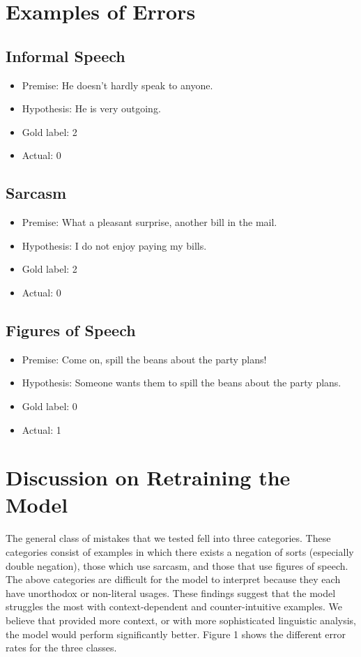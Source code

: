 \documentclass{article}
\begin{document}
\section{Examples of Errors}
\subsection{Informal Speech}
\begin{itemize}
\item Premise: He doesn’t hardly speak to anyone.
\item Hypothesis: He is very outgoing.
\item Gold label: 2
\item Actual: 0
\end{itemize}

\subsection{Sarcasm}
\begin{itemize}
\item Premise: What a pleasant surprise, another bill in the mail.
\item Hypothesis: I do not enjoy paying my bills.
\item Gold label: 2
\item Actual: 0
\end{itemize}
  
\subsection{Figures of Speech}
\begin{itemize}
\item Premise: Come on, spill the beans about the party plans!
\item Hypothesis: Someone wants them to spill the beans about the party plans.
\item Gold label: 0
\item Actual: 1
\end{itemize}

\newpage
\section{Discussion on Retraining the Model}
The general class of mistakes that we tested fell into three categories. These categories consist of examples in which there exists a negation of sorts 
(especially double negation), those which use sarcasm, and those that use figures of speech. The above categories are difficult for the model to interpret because
they each have unorthodox or non-literal usages. These findings suggest that the model struggles the most with context-dependent and counter-intuitive examples. We 
believe that provided more context, or with more sophisticated linguistic analysis, the model would perform significantly better. Figure 1 shows the different error
rates for the three classes.
\end{document}

